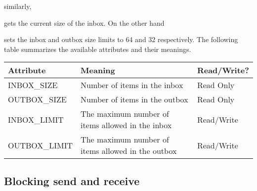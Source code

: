 
\noindent similarly, 


\noindent
gets the current size of the inbox. On the other hand

\noindent sets the inbox and outbox size limits to 64 and 32 respectively.
The following table summarizes the available attributes and their meanings.


\begin{flushleft}
\begin{tabular}{p{1.6in} p{2.8in} p{1.5in}}
 Attribute & Meaning & Read/Write?\\
\hline
INBOX\_SIZE &
Number of items in the inbox &
Read Only\\
OUTBOX\_SIZE &
Number of items in the outbox &
Read Only\\
INBOX\_LIMIT &
The maximum number of items allowed in the inbox &
Read/Write\\
OUTBOX\_LIMIT &
The maximum number of items allowed in the outbox &
Read/Write\\
\end{tabular}
\end{flushleft}

\subsection*{Blocking send and receive}

